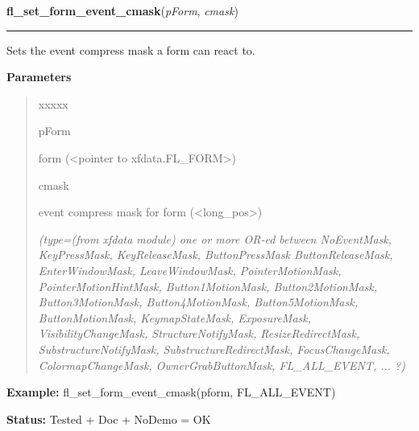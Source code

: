 \hspace{.8\funcindent}\begin{boxedminipage}{\funcwidth}

    \raggedright \textbf{fl\_set\_form\_event\_cmask}(\textit{pForm}, \textit{cmask})

    \vspace{-1.5ex}

    \rule{\textwidth}{0.5\fboxrule}
\setlength{\parskip}{2ex}
    Sets the event compress mask a form can react to.

\setlength{\parskip}{1ex}
      \textbf{Parameters}
      \vspace{-1ex}

      \begin{quote}
        \begin{Ventry}{xxxxx}

          \item[pForm]

          form ({\textless}pointer to xfdata.FL\_FORM{\textgreater})

          \item[cmask]

          event compress mask for form ({\textless}long\_pos{\textgreater})

            {\it (type=(from xfdata module) one or more OR-ed between NoEventMask, KeyPressMask, 
KeyReleaseMask, ButtonPressMask ButtonReleaseMask, EnterWindowMask, 
LeaveWindowMask, PointerMotionMask, PointerMotionHintMask, 
Button1MotionMask, Button2MotionMask, Button3MotionMask, Button4MotionMask,
Button5MotionMask, ButtonMotionMask, KeymapStateMask, ExposureMask, 
VisibilityChangeMask, StructureNotifyMask, ResizeRedirectMask, 
SubstructureNotifyMask, SubstructureRedirectMask, FocusChangeMask, 
ColormapChangeMask, OwnerGrabButtonMask, FL\_ALL\_EVENT, ... ?)}

        \end{Ventry}

      \end{quote}

\textbf{Example:} fl\_set\_form\_event\_cmask(pform, FL\_ALL\_EVENT)



\textbf{Status:} Tested + Doc + NoDemo = OK



    \end{boxedminipage}

    \label{xformslib:library:fl_get_form_event_cmask}


